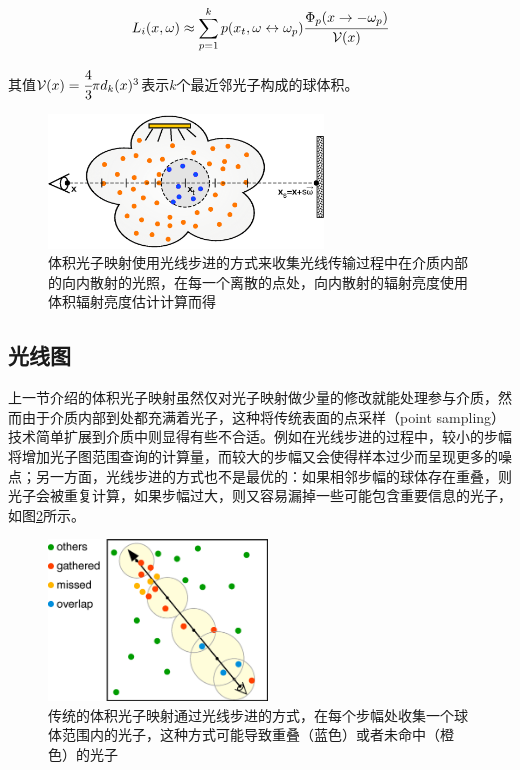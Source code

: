 \begin{equation}
	L_i(x,{\omega})\approx\sum^{k}_{p=1}p(x_t,{\omega}\leftrightarrow{\omega}_p) \cfrac{\Phi_p(x\to-{\omega}_p)}{\mathcal{V}(x)}
\end{equation}

\noindent 其值$\mathcal{V}(x)= \cfrac{4}{3}\pi d_k(x)^{3}$表示$k$个最近邻光子构成的球体积。

\begin{figure}
	\sidecaption
	\includegraphics[width=0.65\textwidth]{figures/pm/vpm-ray-marching}
	\caption{体积光子映射使用光线步进的方式来收集光线传输过程中在介质内部的向内散射的光照，在每一个离散的点处，向内散射的辐射亮度使用体积辐射亮度估计计算而得}
	\label{f:pm-vpm-ray-marching}
\end{figure}





\subsection{光线图}\label{sec:pm-ray-maps}
上一节介绍的体积光子映射虽然仅对光子映射做少量的修改就能处理参与介质，然而由于介质内部到处都充满着光子，这种将传统表面的点采样（point sampling）技术简单扩展到介质中则显得有些不合适。例如在光线步进的过程中，较小的步幅将增加光子图范围查询的计算量，而较大的步幅又会使得样本过少而呈现更多的噪点；另一方面，光线步进的方式也不是最优的：如果相邻步幅的球体存在重叠，则光子会被重复计算，如果步幅过大，则又容易漏掉一些可能包含重要信息的光子，如图\ref{f:pm-gathering-searches}所示。

\begin{figure}
	\sidecaption
	\includegraphics[width=0.52\textwidth]{figures/pm/gathering-searches}
	\caption{传统的体积光子映射通过光线步进的方式，在每个步幅处收集一个球体范围内的光子，这种方式可能导致重叠（蓝色）或者未命中（橙色）的光子}
	\label{f:pm-gathering-searches}
\end{figure}

